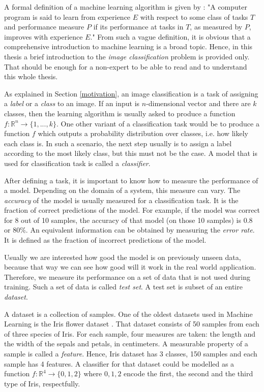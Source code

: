 A formal definition of a machine learning algorithm is given by \cite{Mitchell:1997:ML:541177}: "A computer program is said to learn from experience $E$ with respect to some class of tasks $T$ and performance measure $P$ if its performance at tasks in $T$, as measured by $P$, improves with experience $E$." 
From such a vague definition, it is obvious that a comprehensive introduction to machine learning is a broad topic. Hence, in this thesis a brief introduction to the \textit{image classification} problem is provided only. That should be enough for a non-expert to be able to read and to understand this whole thesis.

As explained in Section \ref{motivation}, an image classification is a task of assigning a \textit{label} or a \textit{class} to an image. If an input is $n$-dimensional vector and there are $k$ classes, then the learning algorithm is usually asked to produce a function $f: \mathbb{R}^n \rightarrow \{1, ... , k\}$. One other variant of a classification task would be to produce a function $f$ which outputs a probability distribution over classes, i.e. how likely each class is. In such a scenario, the next step usually is to assign a label according to the most likely class, but this must not be the case. A model that is used for classification task is called a \textit{classifier}.

After defining a task, it is important to know how to measure the performance of a model. Depending on the domain of a system, this measure can vary. The \textit{accuracy} of the model is usually measured for a classification task. It is the fraction of correct predictions of the model. For example, if the model was correct for 8 out of 10 samples, the accuracy of that model (on those 10 samples) is $0.8$ or $80\%$. An equivalent information can be obtained by measuring the \textit{error rate}. It is defined as the fraction of incorrect predictions of the model. 

Usually we are interested how good the model is on previously unseen data, because that way we can see how good will it work in the real world application. Therefore, we measure its performance on a set of data that is not used during training. Such a set of data is called \textit{test set}. A test set is subset of an entire \textit{dataset}.

A dataset is a collection of samples. One of the oldest datasets used in Machine Learning is the Iris flower dataset \cite{iris-dataset}. That dataset consists of 50 samples from each of three species of Iris. For each sample, four measures are taken: the length and the width of the sepals and petals, in centimeters. A measurable property of a sample is called a \textit{feature}. Hence, Iris dataset has 3 classes, 150 samples and each sample has 4 features. A classifier for that dataset could be modelled as a function $f: \mathbb{R}^4 \rightarrow \{0, 1, 2\}$ where $0, 1, 2$  encode the first, the second and the third type of Iris, respectfully.

